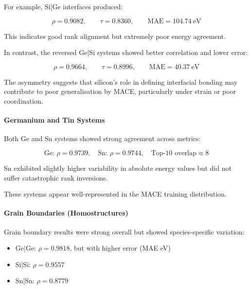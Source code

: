 For example, Si|Ge interfaces produced:


\[
\rho = 0.9082, \qquad \tau = 0.8360, \qquad \text{MAE} = 104.74~\text{eV}
\]


This indicates good rank alignment but extremely poor energy agreement.

In contrast, the reversed Ge|Si systems showed better correlation and lower error:


\[
\rho = 0.9664, \qquad \tau = 0.8996, \qquad \text{MAE} = 40.37~\text{eV}
\]


The asymmetry suggests that silicon's role in defining interfacial bonding may contribute to poor generalisation by
MACE, particularly under strain or poor coordination.


\paragraph{Germanium and Tin Systems}


Both Ge and Sn systems showed strong agreement across metrics:


\[
\text{Ge: } \rho = 0.9739, \quad \text{Sn: } \rho = 0.9744, \quad \text{Top-10 overlap} \approx 8
\]


Sn exhibited slightly higher variability in absolute energy values but did not suffer catastrophic rank inversions.

These systems appear well-represented in the MACE training distribution.


\paragraph{Grain Boundaries (Homostructures)}


Grain boundary results were strong overall but showed species-specific variation:


\begin{itemize}
  \item Ge|Ge: $\rho = 0.9818$, but with higher error (MAE  eV)
  \item Si|Si: $\rho = 0.9557$
  \item Sn|Sn: $\rho = 0.8779$
\end{itemize}

